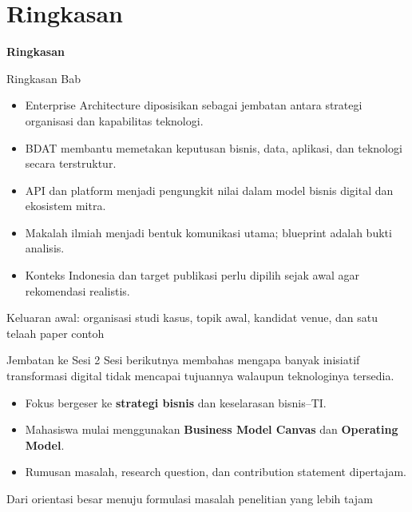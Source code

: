 \documentclass[aspectratio=169, table]{beamer}
\newcommand{\sectionframe}[1]{%
  \begin{frame}{\hfill}
    \centering
    \Huge{\textbf{#1}}
  \end{frame}
}
\newcommand{\takeaway}[1]{%
  \vspace{4pt}
  {\footnotesize #1}
}
\begin{document}
\section{Ringkasan}
\sectionframe{Ringkasan}

\begin{frame}{Ringkasan Bab}
  \vspace{8pt}
  \begin{itemize}
    \item Enterprise Architecture diposisikan sebagai jembatan antara strategi organisasi dan kapabilitas teknologi.
    \item BDAT membantu memetakan keputusan bisnis, data, aplikasi, dan teknologi secara terstruktur.
    \item API dan platform menjadi pengungkit nilai dalam model bisnis digital dan ekosistem mitra.
    \item Makalah ilmiah menjadi bentuk komunikasi utama; blueprint adalah bukti analisis.
    \item Konteks Indonesia dan target publikasi perlu dipilih sejak awal agar rekomendasi realistis.
  \end{itemize}

  \takeaway{Keluaran awal: organisasi studi kasus, topik awal, kandidat venue, dan satu telaah paper contoh}
\end{frame}

\begin{frame}{Jembatan ke Sesi 2}
  \vspace{10pt}
  Sesi berikutnya membahas mengapa banyak inisiatif transformasi digital tidak mencapai tujuannya walaupun teknologinya tersedia.

  \vspace{10pt}
  \begin{itemize}
    \item Fokus bergeser ke \textbf{strategi bisnis} dan keselarasan bisnis--TI.
    \item Mahasiswa mulai menggunakan \textbf{Business Model Canvas} dan \textbf{Operating Model}.
    \item Rumusan masalah, research question, dan contribution statement dipertajam.
  \end{itemize}

  \takeaway{Dari orientasi besar menuju formulasi masalah penelitian yang lebih tajam}
\end{frame}
\end{document}
